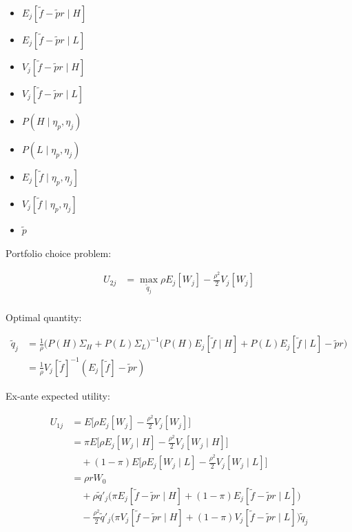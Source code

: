\documentclass{article}
\begin{document}
\begin{itemize}
    \item $E_j[\tilde f - \tilde p r \mid H]$
    \item $E_j[\tilde f - \tilde p r \mid L]$
    \item $V_j[\tilde f - \tilde p r \mid H]$
    \item $V_j[\tilde f - \tilde p r \mid L]$
    \item $P(H \mid \eta_p, \eta_j)$
    \item $P(L \mid \eta_p, \eta_j)$
    \item $E_j[\tilde f \mid \eta_p, \eta_j]$
    \item $V_j[\tilde f \mid \eta_p, \eta_j]$
    \item $\tilde p$
\end{itemize}

Portfolio choice problem:

\begin{align*}
    U_{2j} &= \max_{\tilde q_j}
        \rho E_j [W_j] - \frac{\rho^2}{2} V_j [W_j] \\
\end{align*}

Optimal quantity:

\begin{align*}
    \tilde q_j &= \frac1\rho \bigg( P(H) \Sigma_H + P(L) \Sigma_L \bigg)^{-1} \bigg(
        P(H) E_j [\tilde f \mid H] + P(L) E_j [\tilde f \mid L] - \tilde p r
    \bigg) \\
    &= \frac1\rho V_j[\tilde f]^{-1} (E_j [\tilde f] - \tilde p r)
\end{align*}

Ex-ante expected utility:

\begin{align*}
    U_{1j} &= E\biggl[
        \rho E_j [W_j] - \frac{\rho^2}{2} V_j [W_j]
    \biggr] \\
    &= 
        \pi E\biggl[
            \rho E_j [W_j \mid H] - \frac{\rho^2}{2} V_j [W_j \mid H]
        \biggr] \\
        &\quad +
        (1-\pi) E\biggl[
            \rho E_j [W_j \mid L] - \frac{\rho^2}{2} V_j [W_j \mid L]
        \biggr] \\
    &= \rho r W_0 \\
        &\quad + 
        \rho \tilde q'_j \biggl(
            \pi E_j [\tilde f - \tilde p r \mid H] +
            (1-\pi) E_j [\tilde f - \tilde p r \mid L]
        \biggr) \\
        &\quad -
        \frac{\rho^2}{2} \tilde q'_j \biggl(
            \pi V_j [\tilde f - \tilde p r \mid H] +
            (1-\pi) V_j [\tilde f - \tilde p r \mid L]
        \biggr) \tilde q_j
\end{align*}
\end{document}
